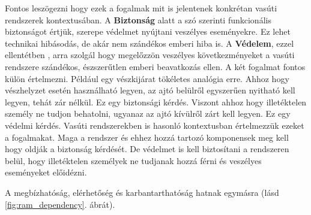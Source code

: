 \documentclass[a4paper,12pt]{article}
\begin{document}
Fontos leszögezni hogy ezek a fogalmak mit is jelentenek konkrétan vasúti rendszerek kontextusában.
A \textbf{Biztonság} alatt a szó szerinti funkcionális biztonságot értjük, szerepe védelmet nyújtani veszélyes eseményekre. 
Ez lehet technikai hibásodás, de akár nem szándékos emberi hiba is.
A \textbf{Védelem}, ezzel ellentétben , arra szolgál hogy megelőzzön veszélyes következményeket a vasúti rendszere szándékos, észszerűtlen emberi beavatkozás ellen.
A két fogalmat fontos külön értelmezni. Például egy vészkijárat tökéletes analógia erre. 
Ahhoz hogy vészhelyzet esetén használható legyen, az ajtó belülről egyszerűen nyitható kell legyen, tehát zár nélkül. Ez egy biztonsági kérdés.
Viszont ahhoz hogy illetéktelen személy ne tudjon behatolni, ugyanaz az ajtó kívülről zárt kell legyen. Ez egy védelmi kérdés.
Vasúti rendszerekben is hasonló kontextusban értelmezzük ezeket a fogalmakat. Maga a rendszer és ehhez hozzá tartozó komponensek meg kell hogy oldják a biztonság kérdését.
De védelmet is kell biztosítani a rendszeren belül, hogy illetéktelen személyek ne tudjanak hozzá férni és veszélyes eseményeket előidézni.

A megbízhatóság, elérhetőség és karbantarthatóság hatnak egymásra (lásd  \ref{fig:ram_dependency}. ábrát).
\end{document}
